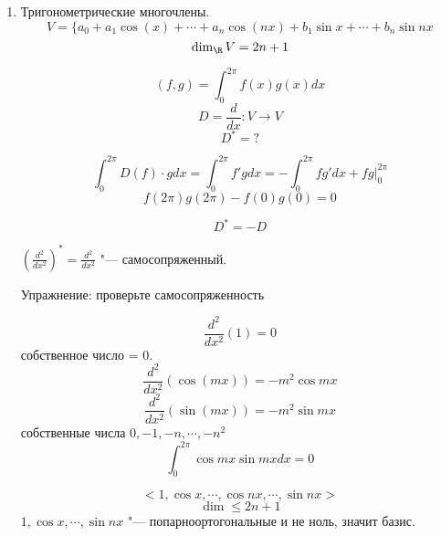 \begin{enumerate}
\begin{proof}
    $$D(P_m(x)) = (x^2 - 1)\frac{d^2}{dx^2}P_{m}(x) + 2x \frac{d}{dx}P_m(x) = m(m + 1)P_m(x)$$

    $V_n, m  =0, 1, \cdots, n$
    $\{P_m\}$ "--- базис $V_m$ 
\end{proof}

Упражнение: 
    \begin{enumerate}
    \item 
    Проверить ортогональность многочленов Чебышева, Лагерра, Эрмита(для соответствующих весов). 
    \item
    Попробуйте найти дифференциальные операторв, чьими собственными функциями являются многочлен Чебышева, Лагерра и Эрмита. 
    \end{enumerate}

\item Тригонометрические многочлены. 
$$V = \{a_0 + a_1 \cos (x) + \cdots + a_n\cos(nx) + b_1 \sin x + \cdots + b_n \sin nx$$
$$\dim_{\R}V = 2n + 1$$

$$(f, g) = \int_{0}^{2 \pi}f(x)g(x)dx$$
$$D = \frac{d}{dx} \colon V \to V$$
$$D^* = ?$$

$$\int_{0}^{2\pi}D(f) \cdot g dx  = \int_{0}^{2\pi}f'g dx = -\int_{0}^{2\pi}fg'dx + fg|_{0}^{2\pi}$$
$$f(2\pi)g(2\pi) - f(0)g(0) = 0$$

$$D^* = -D$$

$(\frac{d^2}{dx^2})^* = \frac{d^2}{dx^2}$ "--- самосопряженный. 

Упражнение: проверьте самосопряженность 

$$\frac{d^2}{dx^2}(1) = 0$$
собственное число = 0.
$$\frac{d^2}{dx^2}(\cos(mx)) = -m^2\cos mx$$
$$\frac{d^2}{dx^2}(\sin(mx)) = -m^2\sin mx$$
собственные числа $0, -1,-n, \cdots, -n^2$
$$\int_{0}^{2\pi}\cos mx \sin mx dx = 0$$

$$<1,\cos x, \cdots, \cos nx, \cdots, \sin nx> $$
$$\dim \le 2n + 1$$
$1, \cos x, \cdots, \sin nx$ "--- попарноортогональные и не ноль, значит базис.
 
\end{enumerate}